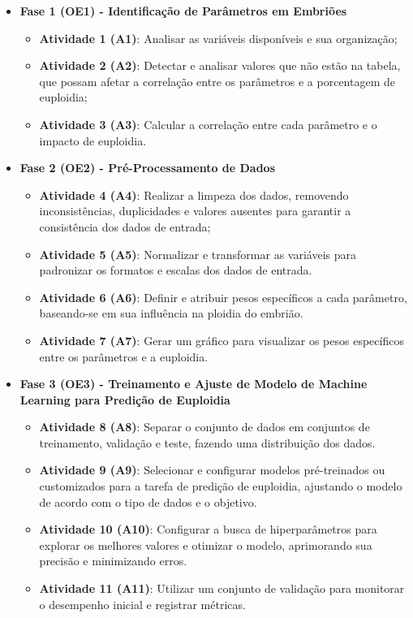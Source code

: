 \begin{itemize}
    \item \textbf{Fase 1 (OE1) - Identificação de Parâmetros em Embriões}
    \begin{itemize}
        \item \textbf{Atividade 1 (A1)}: Analisar as variáveis disponíveis e sua organização;
        \item \textbf{Atividade 2 (A2)}: Detectar e analisar valores que não estão na tabela, que possam afetar a correlação entre os parâmetros e a porcentagem de euploidia;
        \item \textbf{Atividade 3 (A3)}: Calcular a correlação entre cada parâmetro e o impacto de euploidia.
    \end{itemize}
    
    \item \textbf{Fase 2 (OE2) - Pré-Processamento de Dados}
    \begin{itemize}
        \item \textbf{Atividade 4 (A4)}: Realizar a limpeza dos dados, removendo inconsistências, duplicidades e valores ausentes para garantir a consistência dos dados de entrada;
        \item \textbf{Atividade 5 (A5)}: Normalizar e transformar as variáveis para padronizar os formatos e escalas dos dados de entrada.
        \item \textbf{Atividade 6 (A6)}: Definir e atribuir pesos específicos a cada parâmetro, baseando-se em sua influência na ploidia do embrião.
        \item \textbf{Atividade 7 (A7)}: Gerar um gráfico para visualizar os pesos específicos entre os parâmetros e a euploidia.
    \end{itemize}
    
    \item \textbf{Fase 3 (OE3) - Treinamento e Ajuste de Modelo de Machine Learning para Predição de Euploidia}
    \begin{itemize}
        \item \textbf{Atividade 8 (A8)}: Separar o conjunto de dados em conjuntos de treinamento, validação e teste, fazendo uma distribuição dos dados.
        \item \textbf{Atividade 9 (A9)}: Selecionar e configurar modelos pré-treinados ou customizados para a tarefa de predição de euploidia, ajustando o modelo de acordo com o tipo de dados e o objetivo.
        \item \textbf{Atividade 10 (A10)}: Configurar a busca de hiperparâmetros para explorar os melhores valores e otimizar o modelo, aprimorando sua precisão e minimizando erros.
        \item \textbf{Atividade 11 (A11)}: Utilizar um conjunto de validação para monitorar o desempenho inicial e registrar métricas.
    \end{itemize}
    

\end{itemize}
